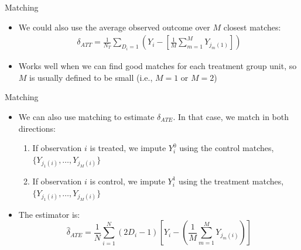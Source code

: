 \documentclass{beamer}
\begin{document}
\begin{frame}{Matching}
	
	\begin{itemize}
	\item We could also use the average observed outcome over $M$ closest matches:
		\begin{eqnarray*}
		\delta_{ATT} = \frac{1}{N_T}\sum_{D_i=1}\left(Y_i-\left[\frac{1}{M}\sum_{m=1}^MY_{j_m(1)}\right]\right)
		\end{eqnarray*}
	\item Works well when we can find good matches for each treatment group unit, so $M$ is usually defined to be small (i.e., $M=1$ or $M=2$)
	\end{itemize}
\end{frame}

\begin{frame}{Matching}
	
	\begin{itemize}
	\item We can also use matching to estimate $\delta_{ATE}$.  In that case, we match in both directions:
		\begin{enumerate}
		\item If observation $i$ is treated, we impute $Y^0_i$ using the control matches,     $\{Y_{j_1(i)}, \dots, Y_{j_M(i)}\}$
		\item If observation $i$ is control, we impute $Y^1_i$ using the treatment matches, $\{Y_{j_1(i)}, \dots, Y_{j_M(i)}\}$
		\end{enumerate}
	\item The estimator is:$$\widehat{\delta}_{ATE} = \frac{1}{N} \sum_{i=1}^N (2D_i -1) \left[ Y_i - \left( \frac{1}{M} \sum_{m=1}^M Y_{j_m(i)} \right) \right]$$	
	\end{itemize}
	
\end{frame}
\end{document}

